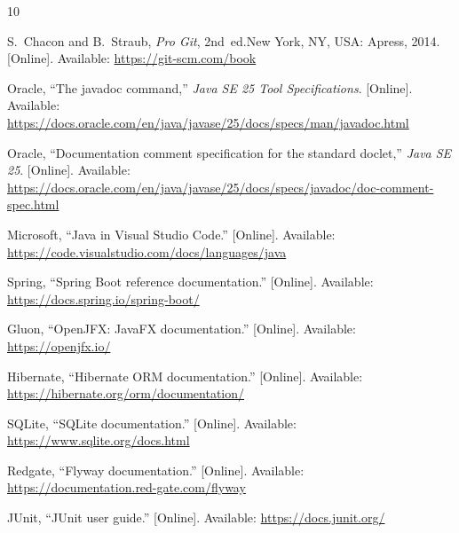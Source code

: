 \begin{thebibliography}{10}

S.~Chacon and B.~Straub, \emph{Pro Git}, 2nd~ed.\quad New York, NY, USA: Apress, 2014. [Online]. Available:
\url{https://git-scm.com/book}

Oracle, ``The javadoc command,'' \emph{Java SE 25 Tool Specifications}. [Online]. Available:
\url{https://docs.oracle.com/en/java/javase/25/docs/specs/man/javadoc.html}

Oracle, ``Documentation comment specification for the standard doclet,'' \emph{Java SE 25}. [Online]. Available:
\url{https://docs.oracle.com/en/java/javase/25/docs/specs/javadoc/doc-comment-spec.html}

Microsoft, ``Java in Visual Studio Code.'' [Online]. Available:
\url{https://code.visualstudio.com/docs/languages/java}

Spring, ``Spring Boot reference documentation.'' [Online]. Available: \url{https://docs.spring.io/spring-boot/}

Gluon, ``OpenJFX: JavaFX documentation.'' [Online]. Available: \url{https://openjfx.io/}

Hibernate, ``Hibernate ORM documentation.'' [Online]. Available: \url{https://hibernate.org/orm/documentation/}

SQLite, ``SQLite documentation.'' [Online]. Available: \url{https://www.sqlite.org/docs.html}

Redgate, ``Flyway documentation.'' [Online]. Available: \url{https://documentation.red-gate.com/flyway}

JUnit, ``JUnit user guide.'' [Online]. Available: \url{https://docs.junit.org/}

\end{thebibliography}
